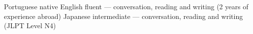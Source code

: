 \begin{cvskills}
  \cvskill
    {Portuguese}
    {native}
  \cvskill
    {English}
    {fluent — conversation, reading and writing (2 years of experience abroad)}
  \cvskill
    {Japanese}
    {intermediate — conversation, reading and writing (JLPT Level N4)}
\end{cvskills}
